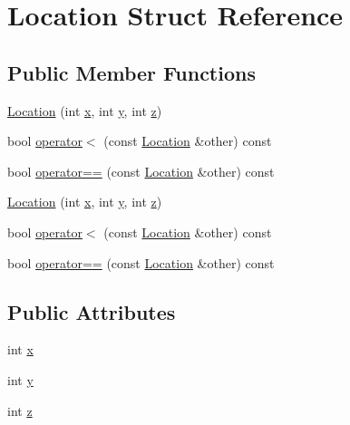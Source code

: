 \hypertarget{struct_location}{}\section{Location Struct Reference}
\label{struct_location}
\subsection*{Public Member Functions}
\begin{DoxyCompactItemize}
\item 
\hyperlink{struct_location_ada7ef731cfa1f39a6512b3e6eecf434d}{Location} (int \hyperlink{struct_location_aea76eebc474e30c04c53e5f03c6749e3}{x}, int \hyperlink{struct_location_a307809776b981810147af56d9304e273}{y}, int \hyperlink{struct_location_ad46e606795ee67a3775a53da49b37284}{z})
\item 
bool \hyperlink{struct_location_af22acefb6d1dd7de7482915b1c2eae5d}{operator$<$} (const \hyperlink{struct_location}{Location} \&other) const
\item 
bool \hyperlink{struct_location_a0c99c1e65cc6607121da4abdb4894b74}{operator==} (const \hyperlink{struct_location}{Location} \&other) const
\item 
\hyperlink{struct_location_ada7ef731cfa1f39a6512b3e6eecf434d}{Location} (int \hyperlink{struct_location_aea76eebc474e30c04c53e5f03c6749e3}{x}, int \hyperlink{struct_location_a307809776b981810147af56d9304e273}{y}, int \hyperlink{struct_location_ad46e606795ee67a3775a53da49b37284}{z})
\item 
bool \hyperlink{struct_location_af22acefb6d1dd7de7482915b1c2eae5d}{operator$<$} (const \hyperlink{struct_location}{Location} \&other) const
\item 
bool \hyperlink{struct_location_a0c99c1e65cc6607121da4abdb4894b74}{operator==} (const \hyperlink{struct_location}{Location} \&other) const
\end{DoxyCompactItemize}
\subsection*{Public Attributes}
\begin{DoxyCompactItemize}
\item 
int \hyperlink{struct_location_aea76eebc474e30c04c53e5f03c6749e3}{x}
\item 
int \hyperlink{struct_location_a307809776b981810147af56d9304e273}{y}
\item 
int \hyperlink{struct_location_ad46e606795ee67a3775a53da49b37284}{z}
\end{DoxyCompactItemize}

